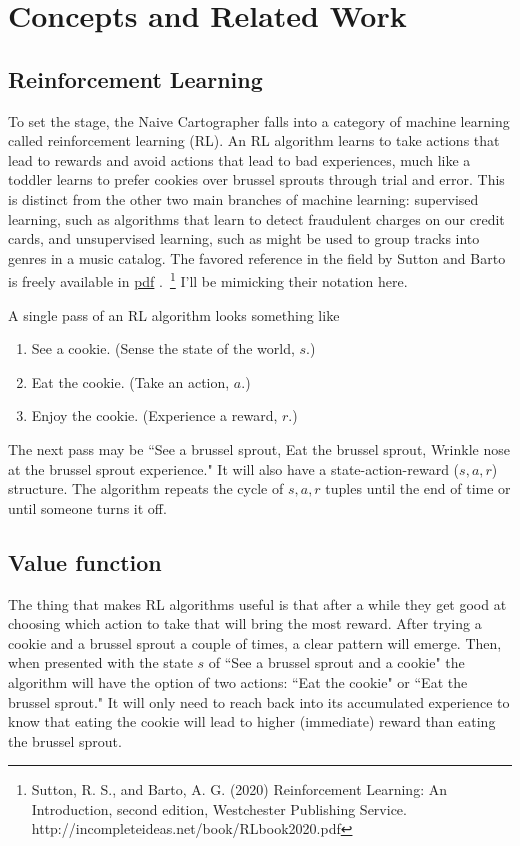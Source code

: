 \section{Concepts and Related Work}
\label{sec:background}

\subsection{Reinforcement Learning}
\label{subsec:reinforcementlearning}

To set the stage, the Naive Cartographer falls into
a category of machine learning
called reinforcement learning (RL). An RL algorithm learns to take actions
that lead to rewards and avoid actions that lead to bad experiences,
much like a toddler learns to prefer cookies over brussel sprouts
through trial and error. This is distinct from the other two main
branches of machine learning: supervised learning, such as algorithms
that learn to detect fraudulent charges on our credit cards,
and unsupervised learning, such as might be used to group tracks
into genres in a music catalog. The favored reference in the field by
Sutton and Barto is freely available in
\href{http://incompleteideas.net/book/RLbook2020.pdf}{pdf}
.~\footnote{Sutton, R. S., and Barto, A. G. (2020) Reinforcement Learning:
An Introduction, second edition, Westchester Publishing Service.
http://incompleteideas.net/book/RLbook2020.pdf }
I'll be mimicking their notation here.

A single pass of an RL algorithm looks something like
\begin{enumerate}
  \item{See a cookie. (Sense the state of the world, $s$.)}
  \item{Eat the cookie. (Take an action, $a$.)}
  \item{Enjoy the cookie. (Experience a reward, $r$.)}
\end{enumerate}
The next pass may be ``See a brussel sprout, Eat the brussel sprout,
Wrinkle nose at the brussel sprout experience." It will also have a
state-action-reward ($s, a, r$) structure. The algorithm repeats
the cycle of $s, a, r$ tuples until the end of time or until someone
turns it off.

\subsection{Value function}
\label{subsec:introvaluefunction}
The thing that makes RL algorithms useful is that after a while they
get good at choosing which action to take that will bring the most reward.
After trying a cookie and a brussel sprout a couple of times,
a clear pattern will emerge. Then, when presented with the state $s$ of
``See a brussel sprout and a cookie" the algorithm will have the option
of two actions: ``Eat the cookie" or ``Eat the brussel sprout."
It will only need to reach back into its accumulated experience to know
that eating the cookie will lead to higher (immediate) reward than eating
the brussel sprout.

